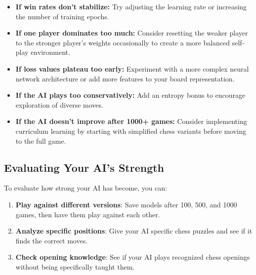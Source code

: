 \documentclass[11pt]{article}
\begin{document}
\begin{tcolorbox}[colback=yellow!5!white,colframe=yellow!75!black,title=Troubleshooting Common Training Issues]
\begin{itemize}
    \item \textbf{If win rates don't stabilize:} Try adjusting the learning rate or increasing the number of training epochs.
    
    \item \textbf{If one player dominates too much:} Consider resetting the weaker player to the stronger player's weights occasionally to create a more balanced self-play environment.
    
    \item \textbf{If loss values plateau too early:} Experiment with a more complex neural network architecture or add more features to your board representation.
    
    \item \textbf{If the AI plays too conservatively:} Add an entropy bonus to encourage exploration of diverse moves.
    
    \item \textbf{If the AI doesn't improve after 1000+ games:} Consider implementing curriculum learning by starting with simplified chess variants before moving to the full game.
\end{itemize}
\end{tcolorbox}

\subsection{Evaluating Your AI's Strength}

To evaluate how strong your AI has become, you can:

\begin{enumerate}
    \item \textbf{Play against different versions}: Save models after 100, 500, and 1000 games, then have them play against each other.
    
    \item \textbf{Analyze specific positions}: Give your AI specific chess puzzles and see if it finds the correct moves.
    
    \item \textbf{Check opening knowledge}: See if your AI plays recognized chess openings without being specifically taught them.
\end{enumerate}
\end{document}
